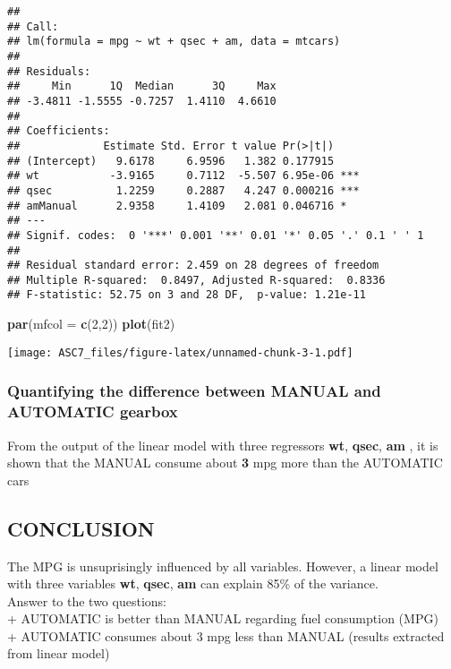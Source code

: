 \documentclass[]{article}
\newenvironment{Shaded}{\begin{snugshade}}{\end{snugshade}}
\newcommand{\KeywordTok}[1]{\textcolor[rgb]{0.13,0.29,0.53}{\textbf{#1}}}
\newcommand{\DataTypeTok}[1]{\textcolor[rgb]{0.13,0.29,0.53}{#1}}
\newcommand{\DecValTok}[1]{\textcolor[rgb]{0.00,0.00,0.81}{#1}}
\newcommand{\NormalTok}[1]{#1}
\begin{document}
\begin{verbatim}
## 
## Call:
## lm(formula = mpg ~ wt + qsec + am, data = mtcars)
## 
## Residuals:
##     Min      1Q  Median      3Q     Max 
## -3.4811 -1.5555 -0.7257  1.4110  4.6610 
## 
## Coefficients:
##             Estimate Std. Error t value Pr(>|t|)    
## (Intercept)   9.6178     6.9596   1.382 0.177915    
## wt           -3.9165     0.7112  -5.507 6.95e-06 ***
## qsec          1.2259     0.2887   4.247 0.000216 ***
## amManual      2.9358     1.4109   2.081 0.046716 *  
## ---
## Signif. codes:  0 '***' 0.001 '**' 0.01 '*' 0.05 '.' 0.1 ' ' 1
## 
## Residual standard error: 2.459 on 28 degrees of freedom
## Multiple R-squared:  0.8497, Adjusted R-squared:  0.8336 
## F-statistic: 52.75 on 3 and 28 DF,  p-value: 1.21e-11
\end{verbatim}

\begin{Shaded}
\begin{Highlighting}[]
\KeywordTok{par}\NormalTok{(}\DataTypeTok{mfcol =} \KeywordTok{c}\NormalTok{(}\DecValTok{2}\NormalTok{,}\DecValTok{2}\NormalTok{))}
\KeywordTok{plot}\NormalTok{(fit2)}
\end{Highlighting}
\end{Shaded}

\texttt{[image: ASC7\_files/figure-latex/unnamed-chunk-3-1.pdf]}

\subsubsection{Quantifying the difference between MANUAL and AUTOMATIC
gearbox}\label{quantifying-the-difference-between-manual-and-automatic-gearbox}

From the output of the linear model with three regressors \textbf{wt},
\textbf{qsec}, \textbf{am} , it is shown that the MANUAL consume about
\textbf{3} mpg more than the AUTOMATIC cars

\subsection{CONCLUSION}\label{conclusion}

The MPG is unsuprisingly influenced by all variables. However, a linear
model with three variables \textbf{wt}, \textbf{qsec}, \textbf{am} can
explain 85\% of the variance.\\
Answer to the two questions:\\
+ AUTOMATIC is better than MANUAL regarding fuel consumption (MPG)\\
+ AUTOMATIC consumes about 3 mpg less than MANUAL (results extracted
from linear model)
\end{document}

